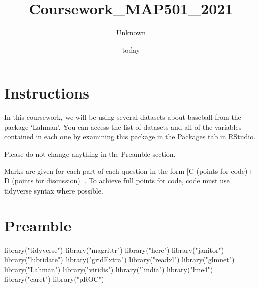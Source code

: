 \documentclass[
]{article}
\title{Coursework\_MAP501\_2021}
\author{Unknown}
\date{today}
\newenvironment{Shaded}{\begin{snugshade}}{\end{snugshade}}
\newcommand{\FunctionTok}[1]{\textcolor[rgb]{0.00,0.00,0.00}{#1}}
\newcommand{\NormalTok}[1]{#1}
\newcommand{\StringTok}[1]{\textcolor[rgb]{0.31,0.60,0.02}{#1}}
\begin{document}
\maketitle

{
\setcounter{tocdepth}{2}
\tableofcontents
}
\hypertarget{instructions}{%
\section{Instructions}\label{instructions}}

In this coursework, we will be using several datasets about baseball
from the package `Lahman'. You can access the list of datasets and all
of the variables contained in each one by examining this package in the
Packages tab in RStudio.

Please do not change anything in the Preamble section.

Marks are given for each part of each question in the form {[}C (points
for code)+ D (points for discussion){]} . To achieve full points for
code, code must use tidyverse syntax where possible.

\hypertarget{preamble}{%
\section{Preamble}\label{preamble}}

\begin{Shaded}
\begin{Highlighting}[]
\FunctionTok{library}\NormalTok{(}\StringTok{"tidyverse"}\NormalTok{)}
\FunctionTok{library}\NormalTok{(}\StringTok{"magrittr"}\NormalTok{)}
\FunctionTok{library}\NormalTok{(}\StringTok{"here"}\NormalTok{)}
\FunctionTok{library}\NormalTok{(}\StringTok{"janitor"}\NormalTok{)}
\FunctionTok{library}\NormalTok{(}\StringTok{"lubridate"}\NormalTok{)}
\FunctionTok{library}\NormalTok{(}\StringTok{"gridExtra"}\NormalTok{)}
\FunctionTok{library}\NormalTok{(}\StringTok{"readxl"}\NormalTok{)}
\FunctionTok{library}\NormalTok{(}\StringTok{"glmnet"}\NormalTok{)}
\FunctionTok{library}\NormalTok{(}\StringTok{"Lahman"}\NormalTok{)}
\FunctionTok{library}\NormalTok{(}\StringTok{"viridis"}\NormalTok{)}
\FunctionTok{library}\NormalTok{(}\StringTok{"lindia"}\NormalTok{)}
\FunctionTok{library}\NormalTok{(}\StringTok{"lme4"}\NormalTok{)}
\FunctionTok{library}\NormalTok{(}\StringTok{"caret"}\NormalTok{)}
\FunctionTok{library}\NormalTok{(}\StringTok{"pROC"}\NormalTok{)}
\end{Highlighting}
\end{Shaded}
\end{document}
